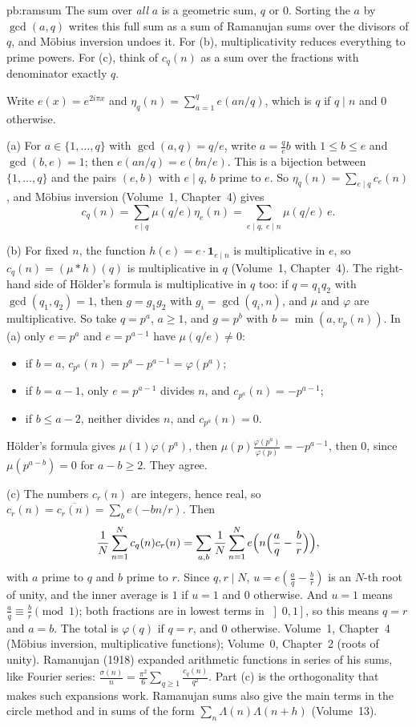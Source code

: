 \begin{solution}{pb:ramsum}
\idea The sum over \emph{all} $a$ is a geometric sum, $q$ or $0$. Sorting the $a$ by $\gcd(a,q)$ writes this full sum as a
sum of Ramanujan sums over the divisors of $q$, and Möbius inversion undoes it. For (b), multiplicativity reduces
everything to prime powers. For (c), think of $c_q(n)$ as a sum over the fractions with denominator exactly $q$.

\writeup Write $e(x)=e^{2i\pi x}$ and $\eta_q(n)=\sum_{a=1}^qe(an/q)$, which is $q$ if $q\mid n$ and $0$ otherwise.

(a) For $a\in\{1,\dots,q\}$ with $\gcd(a,q)=q/e$, write $a=\frac qeb$ with $1\le b\le e$ and $\gcd(b,e)=1$; then
$e(an/q)=e(bn/e)$. This is a bijection between $\{1,\dots,q\}$ and the pairs $(e,b)$ with $e\mid q$, $b$ prime to $e$. So
$\eta_q(n)=\sum_{e\mid q}c_e(n)$, and Möbius inversion (Volume~1, Chapter~4) gives
\[
c_q(n)=\sum_{e\mid q}\mu(q/e)\eta_e(n)=\sum_{e\mid q,\ e\mid n}\mu(q/e)\,e.
\]

(b) For fixed $n$, the function $h(e)=e\cdot\mathbf 1_{e\mid n}$ is multiplicative in $e$, so $c_q(n)=(\mu*h)(q)$ is
multiplicative in $q$ (Volume~1, Chapter~4). The right-hand side of Hölder's formula is multiplicative in $q$ too: if $q=q_1q_2$
with $\gcd(q_1,q_2)=1$, then $g=g_1g_2$ with $g_i=\gcd(q_i,n)$, and $\mu$ and $\varphi$ are multiplicative. So take $q=p^a$,
$a\ge1$, and $g=p^b$ with $b=\min(a,v_p(n))$. In (a) only $e=p^a$ and $e=p^{a-1}$ have $\mu(q/e)\ne0$:
\begin{itemize}
\item if $b=a$, $c_{p^a}(n)=p^a-p^{a-1}=\varphi(p^a)$;
\item if $b=a-1$, only $e=p^{a-1}$ divides $n$, and $c_{p^a}(n)=-p^{a-1}$;
\item if $b\le a-2$, neither divides $n$, and $c_{p^a}(n)=0$.
\end{itemize}
Hölder's formula gives $\mu(1)\varphi(p^a)$, then $\mu(p)\frac{\varphi(p^a)}{\varphi(p)}=-p^{a-1}$, then $0$, since
$\mu(p^{a-b})=0$ for $a-b\ge2$. They agree.

(c) The numbers $c_r(n)$ are integers, hence real, so $c_r(n)=\overline{c_r(n)}=\sum_be(-bn/r)$. Then
\[
\frac1N\sum_{n=1}^Nc_q(n)c_r(n)=\sum_{a,b}\frac1N\sum_{n=1}^Ne\Bigl(n\Bigl(\frac aq-\frac br\Bigr)\Bigr),
\]
with $a$ prime to $q$ and $b$ prime to $r$. Since $q,r\mid N$, $u=e(\frac aq-\frac br)$ is an $N$-th root of unity, and the
inner average is $1$ if $u=1$ and $0$ otherwise. And $u=1$ means $\frac aq\equiv\frac br\pmod1$; both fractions are in
lowest terms in $\left]0,1\right]$, so this means $q=r$ and $a=b$. The total is $\varphi(q)$ if $q=r$, and $0$ otherwise.
\tools Volume~1, Chapter~4 (Möbius inversion, multiplicative functions); Volume~0, Chapter~2 (roots of unity).
\leads Ramanujan (1918) expanded arithmetic functions in series of his sums, like Fourier series:
$\frac{\sigma(n)}n=\frac{\pi^2}6\sum_{q\ge1}\frac{c_q(n)}{q^2}$. Part (c) is the orthogonality
that makes such expansions work. Ramanujan sums also give the main terms in the circle method and in sums of the form
$\sum_n\Lambda(n)\Lambda(n+h)$ (Volume~13).
\end{solution}

